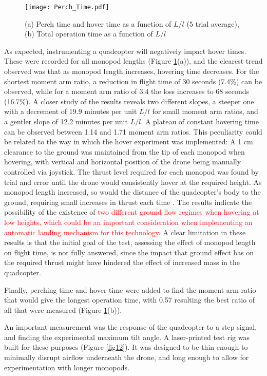 \documentclass[12pt,a4paper]{article}
\begin{document}
\begin{figure}[h!]
\centering
 \texttt{[image: Perch\_Time.pdf]}
  \caption{(a) Perch time and hover time as a function of $L/l$ (5 trial average), (b) Total operation time as a function of $L/l$ }
  \label{fig11}
\end{figure}

As expected, instrumenting a quadcopter will negatively impact hover times. These were recorded for all monopod lengths (Figure \ref{fig11}(a)), and the clearest trend observed was that as monopod length increases, hovering time decreases. For the shortest moment arm ratio, a reduction in flight time of 30 seconds (7.4\%) can be observed, while for a moment arm ratio of 3.4 the loss increases to 68 seconds (16.7\%). A closer study of the results reveals two different slopes, a steeper one with a decrement of 19.9 minutes per unit $L/l$ for small moment arm ratios, and a gentler slope of 12.2 minutes per unit $L/l$. A plateau of constant hovering time can be observed between 1.14 and 1.71 moment arm ratios. This peculiarity could be related to the way in which the hover experiment was implemented: A 1 cm clearance to the ground was maintained from the tip of each monopod when hovering, with vertical and horizontal position of the drone being manually controlled via joystick. The thrust level required for each monopod was found by trial and error until the drone would consistently hover at the required height. As monopod length increased, so would the distance of the quadcopter's body to the ground, requiring small increases in thrust each time \cite {geffect}. The results indicate the possibility of the existence of \textcolor{red}{two different ground flow regimes when hovering at low heights, which could be an important consideration when implementing an automatic landing mechanism for this technology}. A clear limitation in these results is that the initial goal of the test, assessing the effect of monopod length on flight time, is not fully answered, since the impact that ground effect has on the required thrust might have hindered the effect of increased mass in the quadcopter.

Finally, perching time and hover time were added to find the moment arm ratio that would give the longest operation time, with 0.57 resulting the best ratio of all that were measured (Figure \ref{fig11}(b)).

An important measurement was the response of the quadcopter to a step signal, and finding the experimental maximum tilt angle. A laser-printed test rig was built for these purposes (Figure \ref{fig12}). It was designed to be thin enough to minimally disrupt airflow underneath the drone, and long enough to allow for experimentation with longer monopods.
\end{document}
